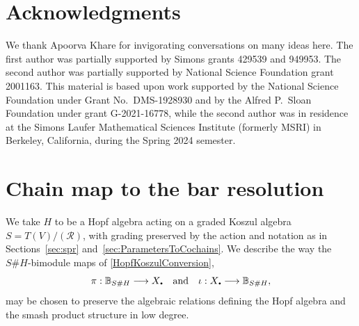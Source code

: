 \documentclass[11pt]{amsart}
\numberwithin{equation}{section}
\newcommand{\R}{\mathcal{R}}
\newcommand{\sd}{_{\DOT}}%
\newcommand{\BB}{\mathbb{B}} %
\newcommand{\DOT}{\setlength{\unitlength}{1.2pt}\begin{picture}(2.5,2)
               (1,1)\put(2.5,2.5){\circle*{2}}\end{picture}}
\renewcommand{\_}[1]{\mbox{$_{\left( #1 \right)}$}}
\newcommand{\Ho}{H}%
\begin{document}
{\section{Acknowledgments}
We thank Apoorva Khare
for invigorating conversations on many ideas here.
The first author was partially supported by Simons grants 429539 and 949953.
The second author was partially supported by National Science Foundation grant 2001163. 
This material is based upon work supported by the National Science Foundation 
under Grant No.~DMS-1928930 and by the Alfred P.~Sloan Foundation under 
grant G-2021-16778, while the second author was in residence at the 
Simons Laufer Mathematical Sciences Institute (formerly MSRI) in Berkeley, 
California, during the Spring 2024 semester.

\appendix
\section{Chain map to the bar resolution}
\label {AppendixValuesLowDegree}

We take $H$ to be a Hopf algebra acting on a graded Koszul algebra
$S = T(V)/ (\R)$, 
with grading preserved by the action and
notation as in Sections~\ref{sec:spr} and~\ref{sec:ParametersToCochains}.  
We describe the way the $S\# H$-bimodule maps 
  of \cref{HopfKoszulConversion},
  $$
\pi: \BB_{S\#\Ho}   \longrightarrow X\sd 
\quad\text{and}\quad 
\iota: X\sd \longrightarrow  \BB_{S\#\Ho} ,
$$
may be chosen to preserve the algebraic relations defining
the Hopf algebra and the smash product structure
in low degree.

}
\end{document}
